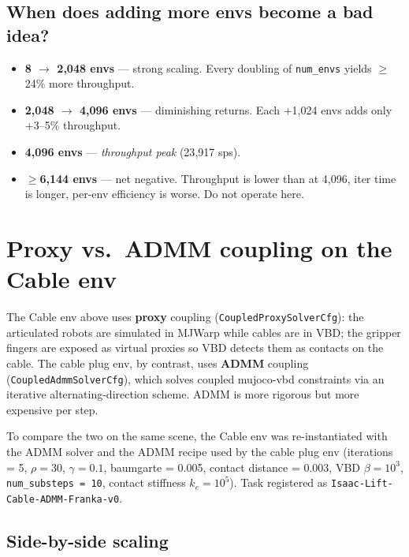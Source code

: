 \documentclass[11pt,a4paper]{article}
\begin{document}
\subsection{When does adding more envs become a bad idea?}

\begin{itemize}\setlength\itemsep{2pt}
  \item \textbf{8 $\rightarrow$ 2{,}048 envs} --- strong scaling. Every
    doubling of \texttt{num\_envs} yields $\geq$24\% more throughput.
  \item \textbf{2{,}048 $\rightarrow$ 4{,}096 envs} --- diminishing returns.
    Each +1{,}024 envs adds only +3--5\% throughput.
  \item \textbf{4{,}096 envs} --- \emph{throughput peak} (23{,}917 sps).
  \item \textbf{$\geq$6{,}144 envs} --- net negative. Throughput is lower
    than at 4{,}096, iter time is longer, per-env efficiency is worse.
    Do not operate here.
\end{itemize}

\section{Proxy vs.\ ADMM coupling on the Cable env}

The Cable env above uses \textbf{proxy} coupling
(\texttt{CoupledProxySolverCfg}): the articulated robots are simulated in MJWarp while
cables are in VBD; the gripper fingers are exposed as virtual
proxies so VBD detects them as contacts on the cable. The cable plug env, by
contrast, uses \textbf{ADMM} coupling (\texttt{CoupledAdmmSolverCfg}), which
solves coupled mujoco-vbd constraints via an iterative
alternating-direction scheme. ADMM is more rigorous but more expensive per
step.

To compare the two on the same scene, the Cable env was re-instantiated
with the ADMM solver and the ADMM recipe used by the cable plug env
(iterations = 5, $\rho = 30$, $\gamma = 0.1$, baumgarte = 0.005, contact
distance = 0.003, VBD $\beta = 10^3$, \texttt{num\_substeps = 10}, contact
stiffness $k_e = 10^5$). Task registered as
\texttt{Isaac-Lift-Cable-ADMM-Franka-v0}.

\subsection{Side-by-side scaling}
\end{document}
